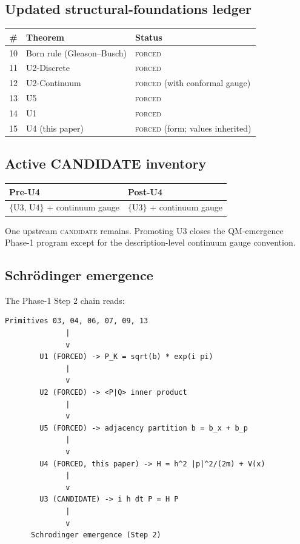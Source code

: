 \documentclass[11pt,a4paper]{article}
\begin{document}
\subsection{Updated structural-foundations ledger}

\begin{center}
\begin{tabular}{cll}
\hline
\# & Theorem & Status \\
\hline
10 & Born rule (Gleason--Busch) & \textsc{forced} \\
11 & U2-Discrete & \textsc{forced} \\
12 & U2-Continuum & \textsc{forced} (with conformal gauge) \\
13 & U5 & \textsc{forced} \\
14 & U1 & \textsc{forced} \\
15 & U4 (this paper) & \textsc{forced} (form; values inherited) \\
\hline
\end{tabular}
\end{center}

\subsection{Active CANDIDATE inventory}

\begin{center}
\begin{tabular}{ll}
\hline
Pre-U4 & Post-U4 \\
\hline
$\{$U3, U4$\}$ + continuum gauge & $\{$U3$\}$ + continuum gauge \\
\hline
\end{tabular}
\end{center}

One upstream \textsc{candidate} remains. Promoting U3 closes the QM-emergence Phase-1 program except for the description-level continuum gauge convention.

\subsection{Schr\"odinger emergence}

The Phase-1 Step 2 chain reads:
\begin{verbatim}
Primitives 03, 04, 06, 07, 09, 13
              |
              v
        U1 (FORCED) -> P_K = sqrt(b) * exp(i pi)
              |
              v
        U2 (FORCED) -> <P|Q> inner product
              |
              v
        U5 (FORCED) -> adjacency partition b = b_x + b_p
              |
              v
        U4 (FORCED, this paper) -> H = h^2 |p|^2/(2m) + V(x)
              |
              v
        U3 (CANDIDATE) -> i h dt P = H P
              |
              v
      Schrodinger emergence (Step 2)
\end{verbatim}
\end{document}
